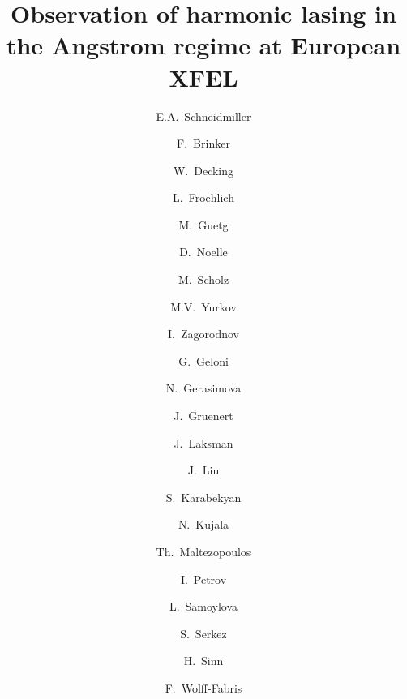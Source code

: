 \documentclass[aps,prl,preprint,groupedaddress,preprintnumbers]{revtex4}
\begin{document}
\newcommand{\re}{\mathop{\mathrm{Re}}}
\newcommand{\im}{\mathop{\mathrm{Im}}}
\newcommand{\I}{\mathop{\mathrm{i}}}
\newcommand{\D}{\mathop{\mathrm{d}}}
\newcommand{\E}{\mathop{\mathrm{e}}}

\def\lambar{\lambda \hspace*{-5pt}{\rule [5pt]{4pt}{0.3pt}} \hspace*{1pt}}








\title{
Observation of harmonic lasing in the Angstrom regime at European XFEL}




\author{E.A.~Schneidmiller}
\author{F.~Brinker}
\author{W.~Decking}
\author{L.~Froehlich}
\author{M.~Guetg}
\author{D.~Noelle}
\author{M.~Scholz}
\author{M.V.~Yurkov}
\author{I.~Zagorodnov}

\author{G.~Geloni}
\author{N.~Gerasimova}
\author{J.~Gruenert}
\author{J.~Laksman}
\author{J.~Liu}
\author{S.~Karabekyan}
\author{N.~Kujala}
\author{Th.~Maltezopoulos}
\author{I.~Petrov}
\author{L.~Samoylova}
\author{S.~Serkez}
\author{H.~Sinn}
\author{F.~Wolff-Fabris}
\end{document}
